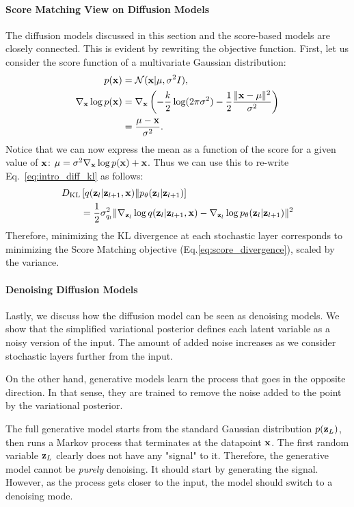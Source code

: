 \paragraph{Score Matching View on Diffusion Models}
The diffusion models discussed in this section and the score-based models are closely connected. This is evident by rewriting the objective function. 
First, let us consider the score function of a multivariate Gaussian distribution:
\begin{align}
    p({\mathbf{x}}) &= \mathcal{N}({\mathbf{x}}|\mu, \sigma^2I),\\
    \nabla_{{\mathbf{x}}}\log p({\mathbf{x}}) &= \nabla_{{\mathbf{x}}}\left(-\frac k2 \log(2\pi\sigma^2) - \frac12 \frac{\|{\mathbf{x}} - \mu\|^2}{\sigma^2}\right) \\
    &= \frac{\mu - {\mathbf{x}}}{\sigma^2}. 
\end{align}
Notice that we can now express the mean as a function of the score for a given value of ${\mathbf{x}}$: $ \mu  = \sigma^2 \nabla_{{\mathbf{x}}}\log p({\mathbf{x}}) + {\mathbf{x}}$. Thus we can use this to re-write Eq.~\ref{eq:intro_diff_kl} as follows:
\begin{align}
    &D_{\mathrm{KL}}\left[q({\mathbf{z}}_l|{\mathbf{z}}_{l+1}, {\mathbf{x}})\|p_{\theta}({\mathbf{z}}_l|{\mathbf{z}}_{l+1})\right] \\
    &\quad\quad= \frac 12 \sigma_{q_l}^2 \|\nabla_{{\mathbf{z}}_l}\log q({\mathbf{z}}_l|{\mathbf{z}}_{l+1}, {\mathbf{x}})  - \nabla_{{\mathbf{z}}_l}\log p_{\theta}({\mathbf{z}}_l|{\mathbf{z}}_{l+1})\|^2
\end{align}
Therefore, minimizing the KL divergence at each stochastic layer corresponds to minimizing the Score Matching objective (Eq.\ref{eq:score_divergence}), scaled by the variance. 

\paragraph{Denoising Diffusion Models}
Lastly, we discuss how the diffusion model can be seen as denoising models. 
We show that the simplified variational posterior defines each latent variable as a noisy version of the input. 
The amount of added noise increases as we consider stochastic layers further from the input. 

On the other hand, generative models learn the process that goes in the opposite direction. 
In that sense, they are trained to remove the noise added to the point by the variational posterior. 

The full generative model starts from the standard Gaussian distribution $p({\mathbf{z}}_L)$, then runs a Markov process that terminates at the datapoint ${\mathbf{x}}$. 
The first random variable ${\mathbf{z}}_L$ clearly does not have any "signal" to it. 
Therefore, the generative model cannot be \textit{purely} denoising. 
It should start by generating the signal. 
However, as the process gets closer to the input, the model should switch to a denoising mode. 

